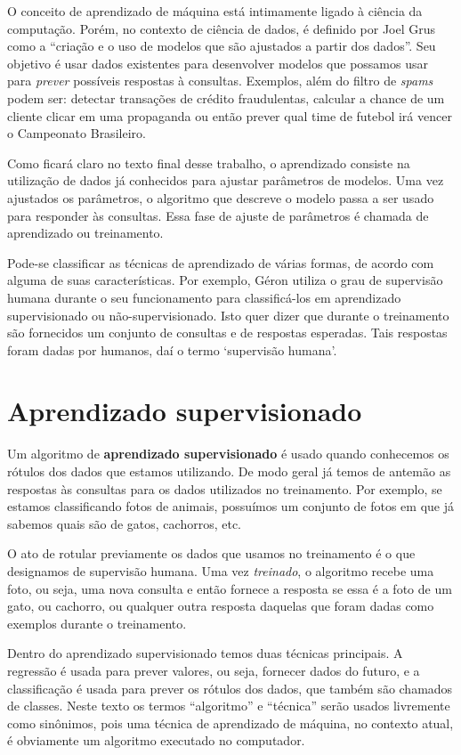 \documentclass[12pt,brazil]{article}
\newcommand{\defi}[1]{\textbf{#1}}
\newcommand{\eng}[1]{\emph{#1}}
\begin{document}
O conceito de aprendizado de máquina está intimamente ligado à ciência da computação. Porém, no contexto de ciência de dados, é definido por Joel Grus \citep{data} como a ``criação e o uso de modelos que são ajustados a partir dos dados''. Seu objetivo é usar dados existentes para desenvolver modelos que possamos usar para \emph{prever} possíveis respostas à consultas. Exemplos, além do filtro de \eng{spams} podem ser: detectar transações de crédito fraudulentas, calcular a chance de um cliente clicar em uma propaganda ou então prever qual time de futebol irá vencer o Campeonato Brasileiro.

Como ficará claro no texto final desse trabalho, o aprendizado consiste na utilização de dados já conhecidos para ajustar parâmetros de modelos. Uma vez ajustados os parâmetros, o algoritmo que descreve o modelo passa a ser usado para responder às consultas. Essa fase de ajuste de parâmetros é chamada de aprendizado ou treinamento.

Pode-se classificar as técnicas de aprendizado de várias formas, de acordo com alguma de suas características. Por exemplo, Géron \citep{hands} utiliza o grau de supervisão humana durante o seu funcionamento para classificá-los em aprendizado supervisionado ou não-supervisionado. Isto quer dizer que durante o treinamento são fornecidos um conjunto de consultas e de respostas esperadas. Tais respostas foram dadas por humanos, daí o termo `supervisão humana'.

\section*{Aprendizado supervisionado}

 Um algoritmo de \defi{aprendizado supervisionado} é usado quando conhecemos os rótulos dos dados que estamos utilizando. De modo geral já temos de antemão as respostas às consultas para os dados utilizados no treinamento. Por exemplo, se estamos classificando fotos de animais, possuímos um conjunto de fotos em que já sabemos quais são de gatos, cachorros, etc.

 O ato de rotular previamente os dados que usamos no treinamento é o que designamos de supervisão humana. Uma vez \emph{treinado}, o algoritmo recebe uma foto, ou seja, uma nova consulta e então fornece a resposta se essa é a foto de um gato, ou cachorro, ou qualquer outra resposta daquelas que foram dadas como exemplos durante o treinamento.

Dentro do aprendizado supervisionado temos duas técnicas principais. A regressão é usada para prever valores, ou seja, fornecer dados do futuro, e a classificação é usada para prever os rótulos dos dados, que também são chamados de classes. Neste texto os termos ``algoritmo'' e ``técnica'' serão usados livremente como sinônimos, pois uma técnica de aprendizado de máquina, no contexto atual, é obviamente um algoritmo executado no computador.
\end{document}

